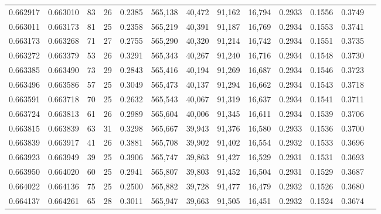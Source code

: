 \begin{tabular}{rrrrrrrrrrrrr}
0.662917 & 0.663010 &  83 &  26 &                                     0.2385 & 565,138 &  40,472 &  91,162 &  16,794 & 0.2933 & 0.1556 & 0.3749 \\
0.663011 & 0.663173 &  81 &  25 &                                     0.2358 & 565,219 &  40,391 &  91,187 &  16,769 & 0.2934 & 0.1553 & 0.3741 \\
0.663173 & 0.663268 &  71 &  27 &                                     0.2755 & 565,290 &  40,320 &  91,214 &  16,742 & 0.2934 & 0.1551 & 0.3735 \\
0.663272 & 0.663379 &  53 &  26 &                                     0.3291 & 565,343 &  40,267 &  91,240 &  16,716 & 0.2934 & 0.1548 & 0.3730 \\
0.663385 & 0.663490 &  73 &  29 &                                     0.2843 & 565,416 &  40,194 &  91,269 &  16,687 & 0.2934 & 0.1546 & 0.3723 \\
0.663496 & 0.663586 &  57 &  25 &                                     0.3049 & 565,473 &  40,137 &  91,294 &  16,662 & 0.2934 & 0.1543 & 0.3718 \\
0.663591 & 0.663718 &  70 &  25 &                                     0.2632 & 565,543 &  40,067 &  91,319 &  16,637 & 0.2934 & 0.1541 & 0.3711 \\
0.663724 & 0.663813 &  61 &  26 &                                     0.2989 & 565,604 &  40,006 &  91,345 &  16,611 & 0.2934 & 0.1539 & 0.3706 \\
0.663815 & 0.663839 &  63 &  31 &                                     0.3298 & 565,667 &  39,943 &  91,376 &  16,580 & 0.2933 & 0.1536 & 0.3700 \\
0.663839 & 0.663917 &  41 &  26 &                                     0.3881 & 565,708 &  39,902 &  91,402 &  16,554 & 0.2932 & 0.1533 & 0.3696 \\
0.663923 & 0.663949 &  39 &  25 &                                     0.3906 & 565,747 &  39,863 &  91,427 &  16,529 & 0.2931 & 0.1531 & 0.3693 \\
0.663950 & 0.664020 &  60 &  25 &                                     0.2941 & 565,807 &  39,803 &  91,452 &  16,504 & 0.2931 & 0.1529 & 0.3687 \\
0.664022 & 0.664136 &  75 &  25 &                                     0.2500 & 565,882 &  39,728 &  91,477 &  16,479 & 0.2932 & 0.1526 & 0.3680 \\
0.664137 & 0.664261 &  65 &  28 &                                     0.3011 & 565,947 &  39,663 &  91,505 &  16,451 & 0.2932 & 0.1524 & 0.3674 \\

\end{tabular}
